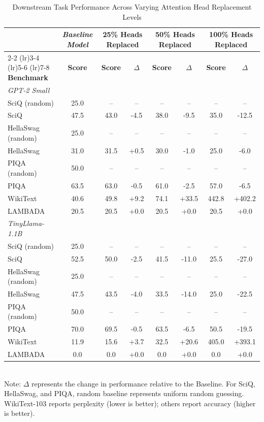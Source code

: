 \begin{table}[ht]
\centering
\caption{Downstream Task Performance Across Varying Attention Head Replacement Levels}
\label{tab:replacement_scaling}
\setlength{\tabcolsep}{0pt}
\begin{tabular*}{\textwidth}{@{\extracolsep{\fill}} l c cc cc cc @{}}
\toprule
& \textit{Baseline Model} & \multicolumn{2}{c}{\textbf{25\% Heads Replaced}} & \multicolumn{2}{c}{\textbf{50\% Heads Replaced}} & \multicolumn{2}{c}{\textbf{100\% Heads Replaced}} \\
\cmidrule(lr){2-2} \cmidrule(lr){3-4} \cmidrule(lr){5-6} \cmidrule(lr){7-8}
\textbf{Benchmark} & \textbf{Score} & \textbf{Score} & \textbf{$\Delta$} & \textbf{Score} & \textbf{$\Delta$} & \textbf{Score} & \textbf{$\Delta$} \\
\midrule
\textit{GPT-2 Small} & & & & & & & \\
SciQ (random) & 25.0 & -- & -- & -- & -- & -- & -- \\
SciQ & 47.5 & 43.0 & -4.5 & 38.0 & -9.5 & 35.0 & -12.5 \\
HellaSwag (random) & 25.0 & -- & -- & -- & -- & -- & -- \\
HellaSwag & 31.0 & 31.5 & +0.5 & 30.0 & -1.0 & 25.0 & -6.0 \\
PIQA (random) & 50.0 & -- & -- & -- & -- & -- & -- \\
PIQA & 63.5 & 63.0 & -0.5 & 61.0 & -2.5 & 57.0 & -6.5 \\
WikiText & 40.6 & 49.8 & +9.2 & 74.1 & +33.5 & 442.8 & +402.2 \\
LAMBADA & 20.5 & 20.5 & +0.0 & 20.5 & +0.0 & 20.5 & +0.0 \\
\midrule
\textit{TinyLlama-1.1B} & & & & & & & \\
SciQ (random) & 25.0 & -- & -- & -- & -- & -- & -- \\
SciQ & 52.5 & 50.0 & -2.5 & 41.5 & -11.0 & 25.5 & -27.0 \\
HellaSwag (random) & 25.0 & -- & -- & -- & -- & -- & -- \\
HellaSwag & 47.5 & 43.5 & -4.0 & 33.5 & -14.0 & 25.0 & -22.5 \\
PIQA (random) & 50.0 & -- & -- & -- & -- & -- & -- \\
PIQA & 70.0 & 69.5 & -0.5 & 63.5 & -6.5 & 50.5 & -19.5 \\
WikiText & 11.9 & 15.6 & +3.7 & 32.5 & +20.6 & 405.0 & +393.1 \\
LAMBADA & 0.0 & 0.0 & +0.0 & 0.0 & +0.0 & 0.0 & +0.0 \\
\bottomrule
\end{tabular*}
\vspace{1mm}
\small \\ Note: $\Delta$ represents the change in performance relative to the Baseline. For SciQ, HellaSwag, and PIQA, random baseline represents uniform random guessing. WikiText-103 reports perplexity (lower is better); others report accuracy (higher is better).
\end{table}